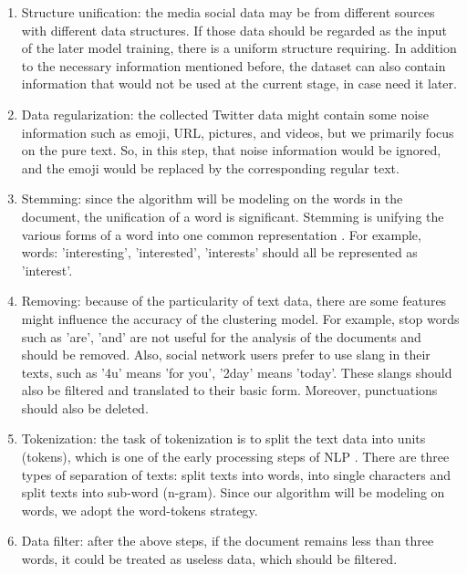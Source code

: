 \begin{enumerate}
    \item Structure unification: the media social data may be from different sources with different data structures. If those data should be regarded as the input of the later model training, there is a uniform structure requiring. In addition to the necessary information mentioned before, the dataset can also contain information that would not be used at the current stage, in case need it later.
   
    \item Data regularization: the collected Twitter data might contain some noise information such as emoji, URL, pictures, and videos, but we primarily focus on the pure text. So, in this step, that noise information would be ignored, and the emoji would be replaced by the corresponding regular text. 
   
    \item Stemming: since the algorithm will be modeling on the words in the document, the unification of a word is significant. Stemming is unifying the various forms of a word into one common representation \cite{vijayarani2015preprocessing}. For example, words: 'interesting', 'interested', 'interests' should all be represented as 'interest'. 
    \item Removing: because of the particularity of text data, there are some features might influence the accuracy of the clustering model. For example, stop words such as 'are', 'and' are not useful for the analysis of the documents and should be removed. Also, social network users prefer to use slang in their texts, such as '4u' means 'for you', '2day' means 'today'. These slangs should also be filtered and translated to their basic form. Moreover, punctuations should also be deleted.
   
    \item Tokenization: the task of tokenization is to split the text data into units (tokens), which is one of the early processing steps of NLP \cite{grefenstette1999tokenization}. There are three types of separation of texts: split texts into words, into single characters and split texts into sub-word (n-gram). Since our algorithm will be modeling on words, we adopt the word-tokens strategy.
    
    \item Data filter: after the above steps, if the document remains less than three words, it could be treated as useless data, which should be filtered. 
\end{enumerate}

